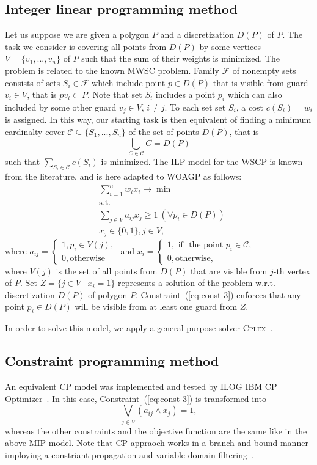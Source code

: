 \documentclass[runningheads,a4paper]{elsarticle}
\begin{document}
	\subsection{Integer linear programming method}
	Let us suppose we are given a polygon $P$ and a discretization $D(P)$ of $P$.  The task we consider is covering all points from $D(P)$ by some vertices $V=\{v_1,...,v_n\}$ of $P$ such that the sum of their weights is minimized.
	The problem is related to the known MWSC problem.
	Family $\mathcal{F}$ of nonempty sets consists of sets
	$S_i \in \mathcal{F}$ which include point $p \in D(P)$ that is visible from guard $v_i\in V$, that is $pv_i \subset P$.  Note that set $S_i$ includes a point $p_i$ which can also included by some other guard $v_j\in V$, $i \neq j$. To each set set $S_i$, a cost $c(S_i) = w_i$ is assigned.  In this way, our starting task is then equivalent of finding a minimum cardinalty cover $\mathcal{C}\subseteq\{S_1,...,S_n\}$ of the set of points $D(P)$, that is
	$$ \bigcup_{C \in \mathcal{C}} C = D(P)$$ such that $\sum_{S_i \in \mathcal{C}} c(S_i)$ is minimized.  The ILP  model for the WSCP is known from the literature, and is here adapted to WOAGP  as follows:
	\begin{align}
	&\sum_{i=1}^n w_ix_i \longrightarrow \min \\
	&\mbox{s.t.} \\
	&\sum_{j\in V} a_{ij}x_j \geq 1\ (\forall p_i\in D(P)) \label{eq:const-3}\\
	& x_j \in \{0,1\}, j \in V,
	\end{align}
	where
	$a_{ij} = \begin{cases}
	1, p_i \in V(j), \\
	0, \mbox{otherwise}
	\end{cases}$
	and $x_i = \begin{cases}
	1, \mbox{ if } \mbox{ the point } p_i \in \mathcal{C},\\
	0, \mbox{otherwise},
	\end{cases}$ \\
	where $V(j)$ is the set of all points from $D(P)$ that are visible from $j$-th vertex of $P$.
	Set $Z = \{j \in V\mid x_i=1\}$ represents a solution of the problem w.r.t. discretization $D(P)$ of polygon $P$.
	Constraint~(\ref{eq:const-3}) enforces that any point $p_i \in D(P)$ will be visible from at least one guard from $Z$.
	
	
	In order to solve this model, we apply a general purpose solver \textsc{Cplex}~\cite{lima2010ibm}.
	\subsection{Constraint programming method} An equivalent CP model was implemented and tested by ILOG IBM CP Optimizer~\cite{}. In this case,  Constraint~(\ref{eq:const-3}) is transformed into
	\begin{equation}
	\bigvee_{ j \in V } (a_{ij} \wedge x_j) = 1,
	\end{equation}
	whereas the other constraints and the objective function are the same like in the above MIP model. Note that CP appraoch works in a branch-and-bound manner imploying a constriant propagation and variable domain filtering~\cite{laborie2018ibm}.
\end{document}
